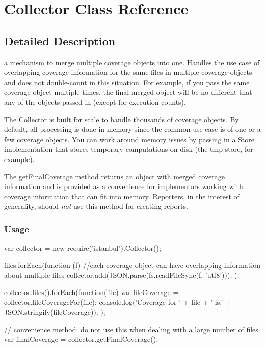 \hypertarget{class_collector}{}\section{Collector Class Reference}
\label{class_collector}


\subsection{Detailed Description}
a mechanism to merge multiple coverage objects into one. Handles the use case of overlapping coverage information for the same files in multiple coverage objects and does not double-\/count in this situation. For example, if you pass the same coverage object multiple times, the final merged object will be no different that any of the objects passed in (except for execution counts).

The {\ttfamily \hyperlink{class_collector}{Collector}} is built for scale to handle thousands of coverage objects. By default, all processing is done in memory since the common use-\/case is of one or a few coverage objects. You can work around memory issues by passing in a {\ttfamily \hyperlink{class_store}{Store}} implementation that stores temporary computations on disk (the {\ttfamily tmp} store, for example).

The {\ttfamily get\+Final\+Coverage} method returns an object with merged coverage information and is provided as a convenience for implementors working with coverage information that can fit into memory. Reporters, in the interest of generality, should {\itshape not} use this method for creating reports.

\subsubsection*{Usage }

\begin{DoxyVerb} var collector = new require('istanbul').Collector();

 files.forEach(function (f) {
     //each coverage object can have overlapping information about multiple files
     collector.add(JSON.parse(fs.readFileSync(f, 'utf8')));
 });

 collector.files().forEach(function(file) {
     var fileCoverage = collector.fileCoverageFor(file);
     console.log('Coverage for ' + file + ' is:' + JSON.stringify(fileCoverage));
 });

 // convenience method: do not use this when dealing with a large number of files
 var finalCoverage = collector.getFinalCoverage();
\end{DoxyVerb}


